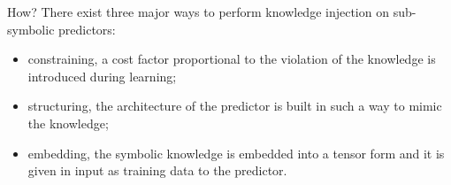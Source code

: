 \documentclass[presentation]{beamer}\mode<presentation>{\usetheme{AMSBolognaFC}}
\begin{document}
\begin{frame}[allowframebreaks]{\skilong}
    \begin{block}{How?}
        There exist three major ways to perform knowledge injection on sub-symbolic predictors:
        \begin{itemize}
            \item \alert{constraining}, a cost factor proportional to the violation of the knowledge is introduced during learning;
            \item \alert{structuring}, the architecture of the predictor is built in such a way to mimic the knowledge;
            \item \alert{embedding}, the symbolic knowledge is embedded into a tensor form and it is given in input as training data to the predictor.
        \end{itemize} 
    \end{block}
    
\end{frame}
\end{document}
